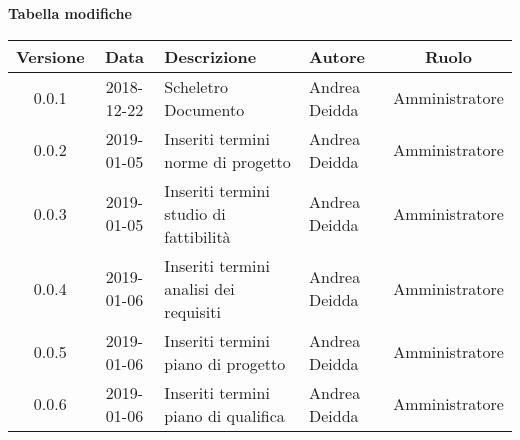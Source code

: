 \begin{center}
	\textbf{Tabella modifiche}
	\end{center}
	\begin{center}
		\begin{tabularx}{\textwidth}{|c|c|X|X|c|}
			\hline
			\textbf{Versione} & \textbf{Data} & \textbf{Descrizione} & \textbf{Autore} & \textbf{Ruolo} \\
			\hline
			0.0.1 & 2018-12-22 & Scheletro Documento & Andrea Deidda & Amministratore\\
			\hline
			0.0.2 & 2019-01-05 & Inseriti termini norme di progetto & Andrea Deidda & Amministratore\\
			\hline
			0.0.3 & 2019-01-05 & Inseriti termini studio di fattibilità & Andrea Deidda & Amministratore\\
			\hline
			0.0.4 & 2019-01-06 & Inseriti termini analisi dei requisiti & Andrea Deidda & Amministratore\\
			\hline
			0.0.5 & 2019-01-06 & Inseriti termini piano di progetto & Andrea Deidda & Amministratore\\
			\hline
			0.0.6 & 2019-01-06 & Inseriti termini piano di qualifica & Andrea Deidda & Amministratore\\
			\hline
		\end{tabularx}
	\end{center}
\newpage